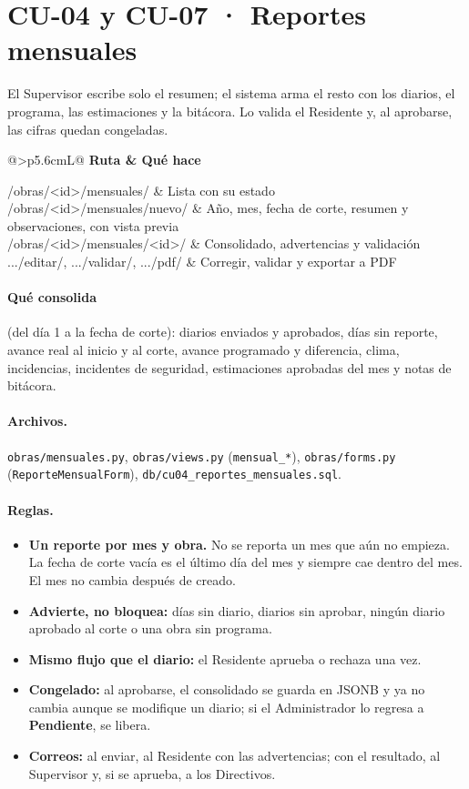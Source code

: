 \documentclass[11pt,letterpaper]{article}
\makeatletter
\newcommand{\cod}[1]{\texttt{\small #1}}
\newcommand{\estatus}[1]{{\sffamily\small\bfseries #1}}
\newcommand{\rutas}[1]{%
\begin{center}\small\rowcolors{2}{grisfondo}{white}
\begin{tabularx}{\linewidth}{@{}>{\ttfamily\footnotesize}p{5.6cm}L@{}}
\toprule\normalfont\sffamily\bfseries Ruta & \sffamily\bfseries Qué hace\\\midrule
#1
\bottomrule\end{tabularx}\end{center}}
\makeatother
\begin{document}
\section{CU-04 y CU-07 · Reportes mensuales}
El Supervisor escribe solo el resumen; el sistema arma el resto con los diarios, el programa, las estimaciones y la bitácora. Lo valida el Residente y, al aprobarse, las cifras quedan congeladas.

\rutas{
/obras/<id>/mensuales/ & Lista con su estado\\
/obras/<id>/mensuales/nuevo/ & Año, mes, fecha de corte, resumen y observaciones, con vista previa\\
/obras/<id>/mensuales/<id>/ & Consolidado, advertencias y validación\\
.../editar/, .../validar/, .../pdf/ & Corregir, validar y exportar a PDF\\
}

\paragraph{Qué consolida} (del día 1 a la fecha de corte): diarios enviados y aprobados, días sin reporte, avance real al inicio y al corte, avance programado y diferencia, clima, incidencias, incidentes de seguridad, estimaciones aprobadas del mes y notas de bitácora.

\paragraph{Archivos.} \cod{obras/mensuales.py}, \cod{obras/views.py} (\cod{mensual\_*}), \cod{obras/forms.py} (\cod{ReporteMensualForm}), \cod{db/cu04\_reportes\_mensuales.sql}.

\paragraph{Reglas.}
\begin{itemize}
  \item \textbf{Un reporte por mes y obra.} No se reporta un mes que aún no empieza. La fecha de corte vacía es el último día del mes y siempre cae dentro del mes. El mes no cambia después de creado.
  \item \textbf{Advierte, no bloquea:} días sin diario, diarios sin aprobar, ningún diario aprobado al corte o una obra sin programa.
  \item \textbf{Mismo flujo que el diario:} el Residente aprueba o rechaza una vez.
  \item \textbf{Congelado:} al aprobarse, el consolidado se guarda en JSONB y ya no cambia aunque se modifique un diario; si el Administrador lo regresa a \estatus{Pendiente}, se libera.
  \item \textbf{Correos:} al enviar, al Residente con las advertencias; con el resultado, al Supervisor y, si se aprueba, a los Directivos.
\end{itemize}
\end{document}
